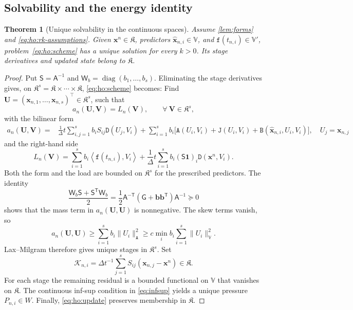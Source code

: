 \documentclass[11pt,a4paper]{article}
\newcommand{\bs}{\boldsymbol}
\newcommand{\dt}{\Delta t}
\newcommand{\V}{\mathbb V}
\newcommand{\DD}{\mathtt D}
\newcommand{\Aform}{\mathtt A}
\newcommand{\JJ}{\mathtt J}
\newcommand{\BB}{\mathtt B}
\newcommand{\ff}{\mathtt f}
\newcommand{\dual}[2]{\left\langle#1,#2\right\rangle}
\newtheorem{theorem}{Theorem}[section]
\theoremstyle{definition}
\numberwithin{equation}{section}
\begin{document}
\subsection{Solvability and the energy identity}
\begin{theorem}[Unique solvability in the continuous spaces]
\label{thm:ho:solvability}
Assume \cref{lem:forms} and \eqref{eq:ho:rk-assumptions}. Given
$\bs x^n\in\mathfrak K$, predictors $\widehat{\bs x}_{n,i}\in\V$, and
$\ff(t_{n,i})\in\V'$, problem~\eqref{eq:ho:scheme} has a unique solution for
 every $k>0$. Its stage derivatives and updated state belong to $\mathfrak K$.
\end{theorem}
\begin{proof}
Put $\mathsf S=\mathsf A^{-1}$ and
$\mathsf W_b=\operatorname{diag}(b_1,\ldots,b_s)$. Eliminating the stage
derivatives gives, on $\mathfrak K^s = \mathfrak K \times \cdots\times \mathfrak K$, \cref{eq:ho:scheme} becomes: Find $\mathbf U = (\bs x_{n,1},\dots,\bs x_{n,s})^\intercal \in \mathfrak K^s$, such that
$$
a_n(\mathbf U,\mathbf V) = L_n(\mathbf V),\qquad\forall~\mathbf V \in \mathfrak K^s,
$$
with the bilinear form
\begin{equation}\label{eq:ho:product-form}
\begin{aligned}
 a_n(\mathbf U,\mathbf V)={}&
 \frac1\dt\sum_{i,j=1}^s b_i S_{ij}\DD(U_j,V_i)+\sum_{i=1}^s b_i\bigl[
   \Aform(U_i,V_i)+\JJ(U_i,V_i)
       +\BB(\widehat{\bs x}_{n,i},U_i,V_i)\bigr],\quad U_j = \bs x_{n,j}
\end{aligned}
\end{equation}
and the right-hand side 
\[
L_n(\mathbf V) =  \sum_{i=1}^s b_i\dual{\ff(t_{n,i})}{V_i}
 +\frac1\dt\sum_{i=1}^s b_i(\mathsf S\bs1)_i\DD(\bs x^n,V_i).
\]
Both the form and the load are bounded on $\mathfrak K^s$ for the prescribed
predictors. The identity
\begin{equation}\label{eq:ho:inverse-positivity}
 \frac{\mathsf W_b\mathsf S+\mathsf S^{\mathsf T}\mathsf W_b}{2}
 =\frac12\mathsf A^{-\mathsf T}
            (\mathsf G+\bs b\bs b^{\mathsf T})\mathsf A^{-1}
 \succeq0
\end{equation}
shows that the mass term in $a_n(\mathbf U,\mathbf U)$ is nonnegative.
The skew terms vanish, so
\[
 a_n(\mathbf U,\mathbf U)\ge
 \sum_{i=1}^s b_i\|U_i\|_{\Aform}^2
 \ge c\min_i b_i\sum_{i=1}^s\|U_i\|_{\V}^2.
\]
Lax--Milgram therefore gives unique stages in $\mathfrak K^s$.
Set
\[
 \mathcal K_{n,i}=\dt^{-1}\sum_{j=1}^s S_{ij}(\bs x_{n,j}-\bs x^n)\in\mathfrak K.
\]
For each stage the remaining residual is a bounded functional on $\V$ that
vanishes on $\mathfrak K$. The continuous inf-sup condition in
\eqref{eq:infsup} yields a unique pressure $P_{n,i}\in W$.
Finally, \eqref{eq:ho:update} preserves membership in $\mathfrak K$.
\end{proof}
\end{document}

